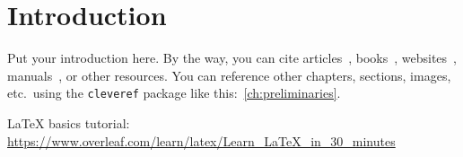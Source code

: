 \chapter*{Introduction}

Put your introduction here. By the way, you can cite articles~\cite{moore_hard_tiling}, books~\cite{golomb_polyomino_book}, websites~\cite{cadical_github}, manuals~\cite{sage}, or other resources. You can reference other chapters, sections, images, etc.\ using the \texttt{cleveref} package like this:~\cref{ch:preliminaries}.

\LaTeX{} basics tutorial: \url{https://www.overleaf.com/learn/latex/Learn_LaTeX_in_30_minutes}
